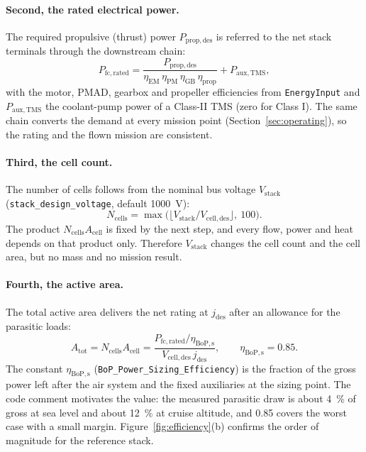 \documentclass[a4paper,11pt]{article}
\newcommand{\code}[1]{\nolinkurl{#1}}
\newcommand{\jdes}{j_\mathrm{des}}
\newcommand{\Vdes}{V_\mathrm{cell,des}}
\begin{document}
\paragraph{Second, the rated electrical power.} The required propulsive (thrust) power
$P_\mathrm{prop,des}$ is referred to the net stack terminals through the downstream chain:
\begin{equation}
  P_\mathrm{fc,rated} = \frac{P_\mathrm{prop,des}}{\eta_\mathrm{EM}\,\eta_\mathrm{PM}\,\eta_\mathrm{GB}\,\eta_\mathrm{prop}}
  + P_\mathrm{aux,TMS},
  \label{eq:prated}
\end{equation}
with the motor, PMAD, gearbox and propeller efficiencies from \code{EnergyInput} and
$P_\mathrm{aux,TMS}$ the coolant-pump power of a Class-II TMS (zero for Class I). The same
chain converts the demand at every mission point (Section~\ref{sec:operating}), so the rating
and the flown mission are consistent.

\paragraph{Third, the cell count.} The number of cells follows from the nominal bus voltage
$V_\mathrm{stack}$ (\code{stack_design_voltage}, default \SI{1000}{V}):
\begin{equation}
  N_\mathrm{cells} = \max\big(\lfloor V_\mathrm{stack}/\Vdes \rfloor,\ 100\big).
\end{equation}
The product $N_\mathrm{cells}A_\mathrm{cell}$ is fixed by the next step, and every flow, power
and heat depends on that product only. Therefore $V_\mathrm{stack}$ changes the cell count and
the cell area, but no mass and no mission result.

\paragraph{Fourth, the active area.} The total active area delivers the net rating at
$\jdes$ after an allowance for the parasitic loads:
\begin{equation}
  A_\mathrm{tot} = N_\mathrm{cells}A_\mathrm{cell}
  = \frac{P_\mathrm{fc,rated}/\eta_\mathrm{BoP,s}}{\Vdes\,\jdes}, \qquad
  \eta_\mathrm{BoP,s} = 0.85 .
  \label{eq:area}
\end{equation}
The constant $\eta_\mathrm{BoP,s}$ (\code{BoP_Power_Sizing_Efficiency}) is the fraction of the
gross power left after the air system and the fixed auxiliaries at the sizing point. The code
comment motivates the value: the measured parasitic draw is about \SI{4}{\percent} of gross at
sea level and about \SI{12}{\percent} at cruise altitude, and 0.85 covers the worst case with
a small margin. Figure~\ref{fig:efficiency}(b) confirms the order of magnitude for the
reference stack.
\end{document}
